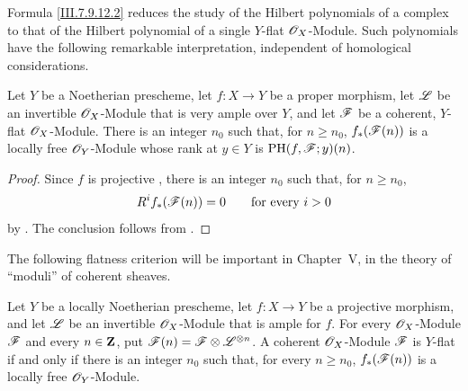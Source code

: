 Formula \eqref{III.7.9.12.2} reduces the study of the
Hilbert polynomials of a complex to that of the Hilbert
polynomial of a single $Y$-flat $\mathscr{O}_X$-Module.  Such
polynomials have the following remarkable interpretation,
independent of homological considerations.

\begin{corollary}[7.9.13]
\label{III.7.9.13}
Let $Y$ be a Noetherian prescheme, let $f:X\to Y$ be a
proper morphism, let $\mathscr{L}$ be an invertible
$\mathscr{O}_X$-Module that is very ample over $Y$, and let
$\mathscr{F}$ be a coherent, $Y$-flat $\mathscr{O}_X$-Module.  There
is an integer $n_0$ such that, for $n\geq n_0$,
$f_*(\mathscr{F}(n))$ is a locally free $\mathscr{O}_Y$-Module whose
rank at $y\in Y$ is $\operatorname{PH}(f,\mathscr{F};y)(n)$.
\end{corollary}

\begin{proof}
Since $f$ is projective , there is an
integer $n_0$ such that, for $n\geq n_0$,
\[
  R^if_*(\mathscr{F}(n))=0
  \qquad\text{for every $i>0$}
\]
by .  The conclusion follows from
.
\end{proof}

The following flatness criterion will be important in
Chapter~V, in the theory of ``moduli'' of coherent
sheaves.

\begin{proposition}[7.9.14]
\label{III.7.9.14}
Let $Y$ be a locally Noetherian prescheme, let
$f:X\to Y$ be a projective morphism, and let $\mathscr{L}$ be
an invertible $\mathscr{O}_X$-Module that is ample for $f$.
For every $\mathscr{O}_X$-Module $\mathscr{F}$ and every
$n\in\mathbf{Z}$, put $\mathscr{F}(n)=\mathscr{F}\otimes\mathscr{L}^{\otimes n}$.
A coherent $\mathscr{O}_X$-Module $\mathscr{F}$ is $Y$-flat if and
only if there is an integer $n_0$ such that, for every
$n\geq n_0$, $f_*(\mathscr{F}(n))$ is a locally free
$\mathscr{O}_Y$-Module.
\end{proposition}

